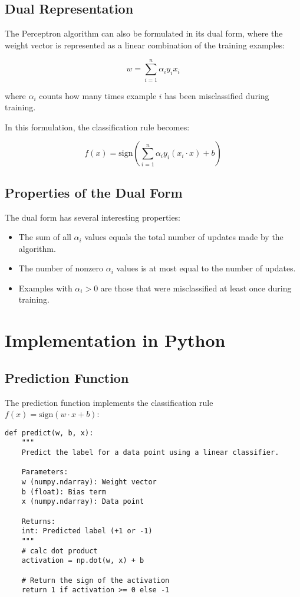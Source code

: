 \documentclass{article}
\begin{document}
\subsection{Dual Representation}

The Perceptron algorithm can also be formulated in its dual form, where the weight vector is represented as a linear combination of the training examples:

\begin{equation}
w = \sum_{i=1}^{n} \alpha_i y_i x_i
\end{equation}

where $\alpha_i$ counts how many times example $i$ has been misclassified during training.

In this formulation, the classification rule becomes:

\begin{equation}
f(x) = \text{sign}\left(\sum_{i=1}^{n} \alpha_i y_i (x_i \cdot x) + b\right)
\end{equation}

\subsection{Properties of the Dual Form}

The dual form has several interesting properties:
\begin{itemize}
    \item The sum of all $\alpha_i$ values equals the total number of updates made by the algorithm.
    \item The number of nonzero $\alpha_i$ values is at most equal to the number of updates.
    \item Examples with $\alpha_i > 0$ are those that were misclassified at least once during training.
\end{itemize}

\section{Implementation in Python}

\subsection{Prediction Function}

The prediction function implements the classification rule $f(x) = \text{sign}(w \cdot x + b)$:

\begin{lstlisting}[caption=Prediction Function]
def predict(w, b, x):
    """
    Predict the label for a data point using a linear classifier.
    
    Parameters:
    w (numpy.ndarray): Weight vector
    b (float): Bias term
    x (numpy.ndarray): Data point
    
    Returns:
    int: Predicted label (+1 or -1)
    """
    # calc dot product
    activation = np.dot(w, x) + b
    
    # Return the sign of the activation
    return 1 if activation >= 0 else -1
\end{lstlisting}
\end{document}
